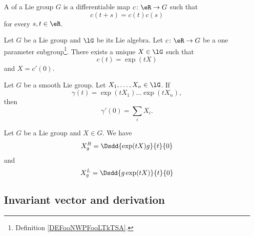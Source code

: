 \begin{definition}	\label{DEFooNWPFooLTkTSA}
	A  of a Lie group \( G\) is a differentiable map \(c \colon \eR\to G  \) such that
	\begin{equation}
		c(t+s)=c(t)c(s)
	\end{equation}
	for every \( s,t\in \eR\).
\end{definition}

\begin{proposition}	\label{PROPooBJDCooRnfKcP}
	Let \( G\) be a Lie group and \( \lG\) be its Lie algebra. Let \(c \colon \eR\to G  \) be a one parameter subgroup\footnote{Definition \ref{DEFooNWPFooLTkTSA}.}. There exists a unique \( X\in \lG\) such that
	\begin{equation}
		c(t)=\exp(tX)
	\end{equation}
	and \( X=c'(0)\).
\end{proposition}


\begin{proposition}	\label{PROPooFJNEooKUhJUl}
	Let \( G\) be a smooth Lie group. Let \( X_1,\ldots,X_n\in \lG\). If
	\begin{equation}
		\gamma(t)=\exp(tX_1)\ldots \exp(tX_n),
	\end{equation}
	then
	\begin{equation}
		\gamma'(0)=\sum_iX_i.
	\end{equation}
\end{proposition}


\begin{lemma}       \label{LEMooLMTZooCvunSl}
	Let \( G\) be a Lie group and \( X\in G\). We have
	\begin{equation}        \label{EQooNBENooPXLENs}
		X^R_g=\Dsdd{  \exp(tX)g }{t}{0}
	\end{equation}
	and
	\begin{equation}
		X^L_g=\Dsdd{  g\exp(tX) }{t}{0}
	\end{equation}
\end{lemma}


\subsection{Invariant vector and derivation}

